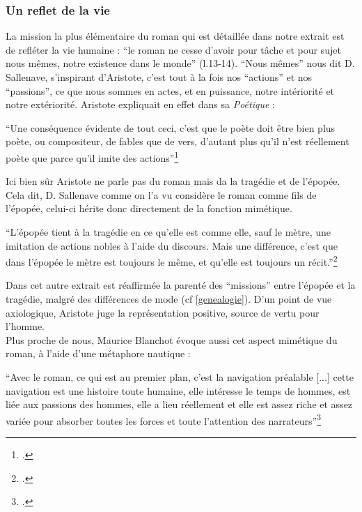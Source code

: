 \documentclass[a4paper,10pt]{article}
\begin{document}
			\subsubsection{Un reflet de la vie}
				La mission la plus élémentaire du roman qui est détaillée dans notre extrait est de refléter la vie humaine : ``le roman ne cesse d'avoir pour tâche et pour sujet nous mêmes, notre existence dans le monde'' (l.13-14). ``Nous mêmes'' nous dit D. Sallenave, s'inspirant d'Aristote, c'est tout à la fois nos ``actions'' et nos ``passions'', ce que nous sommes en actes, et en puissance, notre intériorité et notre extériorité. Aristote expliquait en effet dans sa \textit{Poétique} : 
				\begin{center}
					\footnotesize
					\begin{minipage}{0.7\textwidth}
						``Une conséquence évidente de tout ceci, c'est que le poète doit être bien plus poète, ou compositeur, de fables que de vers, d'autant plus qu'il n'est réellement poète que parce qu'il imite des actions''\footcite[p.~51]{Aristote}
					\end{minipage}
				\end{center}
				Ici bien sûr Aristote ne parle pas du roman mais da la tragédie et de l'épopée. Cela dit, D. Sallenave comme on l'a vu considère le roman comme fils de l'épopée, celui-ci hérite donc directement de la fonction mimétique. 
				\begin{center}
					\footnotesize
					\begin{minipage}{0.7\textwidth}
						``L'épopée tient à la tragédie en ce qu'elle est comme elle, sauf le mètre, une imitation de actions nobles à l'aide du discours. Mais une différence, c'est que dans l'épopée le mètre est toujours le même, et qu'elle est toujours un récit.''\footcite[p.~27]{Aristote}
					\end{minipage}
				\end{center}
				Dans cet autre extrait est réaffirmée la parenté des ``missions'' entre l'épopée et la tragédie, malgré des différences de mode (cf \ref{genealogie}). D'un point de vue axiologique, Aristote juge la représentation positive, source de vertu pour l'homme.\\
				Plus proche de nous, Maurice Blanchot évoque aussi cet aspect mimétique du roman, à l'aide d'une métaphore nautique :
				\begin{center}
					\footnotesize
					\begin{minipage}{0.7\textwidth}
						``Avec le roman, ce qui est au premier plan, c'est la navigation préalable [...] cette navigation est une histoire toute humaine, elle intéresse le temps de hommes, est liée aux passions des hommes, elle a lieu réellement et elle est assez riche et assez variée pour absorber toutes les forces et toute l'attention des narrateurs''\footcite{Blanchot1959}
					\end{minipage}
				\end{center}
\end{document}
